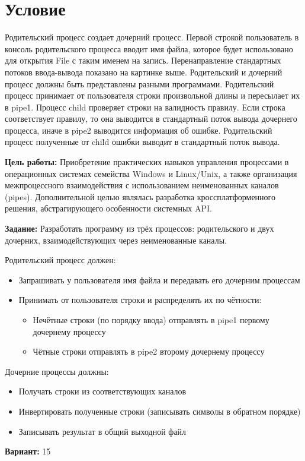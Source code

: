 \section{Условие}
Родительский процесс создает дочерний процесс. Первой строкой пользователь в консоль
родительского процесса вводит имя файла, которое будет использовано для открытия File с таким
именем на запись. Перенаправление стандартных потоков ввода-вывода показано на картинке
выше. Родительский и дочерний процесс должны быть представлены разными программами.
Родительский процесс принимает от пользователя строки произвольной длины и пересылает их в
pipe1. Процесс child проверяет строки на валидность правилу. Если строка соответствует правилу,
то она выводится в стандартный поток вывода дочернего процесса, иначе в pipe2 выводится
информация об ошибке. Родительский процесс полученные от child ошибки выводит в
стандартный поток вывода.

{\bfseries Цель работы:} Приобретение практических навыков управления процессами в операционных системах семейства Windows и Linux/Unix, а также организация межпроцессного взаимодействия с использованием неименованных каналов (pipes). Дополнительной целью являлась разработка кроссплатформенного решения, абстрагирующего особенности системных API.

{\bfseries Задание:} Разработать программу из трёх процессов: родительского и двух дочерних, взаимодействующих через неименованные каналы.

Родительский процесс должен:
\begin{itemize}
    \item Запрашивать у пользователя имя файла и передавать его дочерним процессам
    \item Принимать от пользователя строки и распределять их по чётности:
    \begin{itemize}
        \item Нечётные строки (по порядку ввода) отправлять в pipe1 первому дочернему процессу
        \item Чётные строки отправлять в pipe2 второму дочернему процессу
    \end{itemize}
\end{itemize}

Дочерние процессы должны:
\begin{itemize}
    \item Получать строки из соответствующих каналов
    \item Инвертировать полученные строки (записывать символы в обратном порядке)
    \item Записывать результат в общий выходной файл
\end{itemize}

{\bfseries Вариант:} 15


